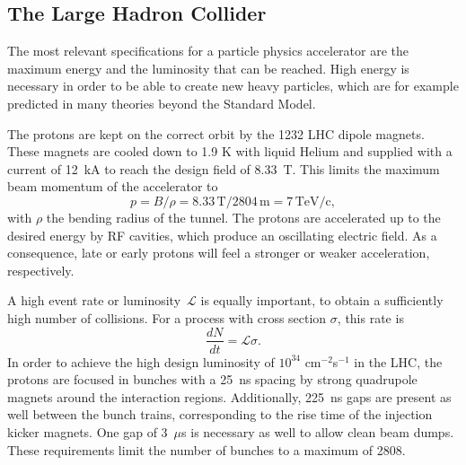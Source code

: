 \subsection{The Large Hadron Collider}

The most relevant specifications for a particle physics accelerator are the maximum energy and the luminosity that can be reached. High energy is necessary in order to be able to create new heavy particles, which are for example predicted in many theories beyond the Standard Model.

The protons are kept on the correct orbit by the 1232 \ac{LHC} dipole magnets. These magnets are cooled down to 1.9 K with liquid Helium and supplied with a current of 12~kA to reach the design field of 8.33~T. This limits the maximum beam momentum of the accelerator to 
\begin{equation}
 p = B/\rho = 8.33\, \mathrm{T}/2804\,\mathrm{m}=7\,\mathrm{TeV/c},
\end{equation}
with $\rho$ the bending radius of the tunnel. The protons are accelerated up to the desired energy by \ac{RF} cavities, which produce an oscillating electric field. As a consequence, late or early protons will feel a stronger or weaker acceleration, respectively.

A high event rate or luminosity~$\mathcal{L}$ is equally important, to obtain a sufficiently high number of collisions. For a process with cross section $\sigma$, this rate is 
\begin{equation}
 \frac{dN}{dt} = \mathcal{L}\sigma .
\end{equation}
In order to achieve the high design luminosity of $10^{34}$ cm$^{-2}$s$^{-1}$ in the \ac{LHC}, the protons are focused in bunches with a \SI{25}{ns} spacing by strong quadrupole magnets around the interaction regions. Additionally, 2\SI{25}{ns} gaps are present as well between the bunch trains, corresponding to the rise time of the injection kicker magnets. One gap of 3~$\mu$s is necessary as well to allow clean beam dumps. These requirements limit the number of bunches to a maximum of 2808.


